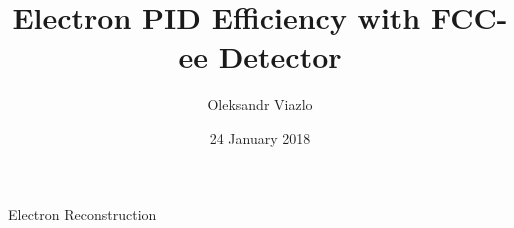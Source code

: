\documentclass[8pt]{beamer}
\newif\ifplacelogo %
\begin{document}
\newcommand{\myNode}{\tikz[baseline,inner sep=1pt] \node[anchor=base]}



\title[ Electron PID Efficiency with FCC-ee Detector \hspace{12.5em}\insertframenumber/
\inserttotalframenumber]{ Electron PID Efficiency with FCC-ee Detector }


	\author[Oleksandr Viazlo]{Oleksandr Viazlo \\ 
	}
	
       
	\date{24 January 2018}


	

   	

\placelogofalse

\begin{frame}{\large \large Electron Reconstruction}
 
\renewcommand{\yRefPosOne}{0}
\renewcommand{\xRefPosOne}{5.3}
\renewcommand{\xRefIncrementOne}{5.5}
\end{frame}
\end{document}

